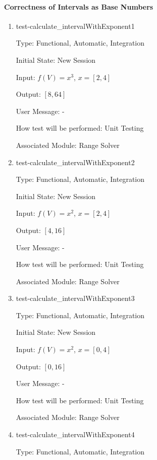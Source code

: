 \documentclass[12pt, titlepage]{article}
\begin{document}
\paragraph{Correctness of Intervals as Base Numbers}

\begin{enumerate}
	
	\item{test-calculate\_intervalWithExponent1}
	
	Type: Functional, Automatic, Integration
	
	Initial State: New Session
	
	Input: $f(V) = x^3$, $x = [2,4]$
	
	Output: $[8,64]$
	
	User Message: - 
	
	How test will be performed: Unit Testing
	
	Associated Module: Range Solver\\
	
	\item{test-calculate\_intervalWithExponent2}
	
	Type: Functional, Automatic, Integration
	
	Initial State: New Session
	
	Input: $f(V) = x^2$, $x = [2,4]$
	
	Output: $[4,16]$
	
	User Message: - 
	
	How test will be performed: Unit Testing
	
	Associated Module: Range Solver\\
	
	\item{test-calculate\_intervalWithExponent3}
	
	Type: Functional, Automatic, Integration
	
	Initial State: New Session
	
	Input: $f(V) = x^2$, $x = [0,4]$
	
	Output: $[0,16]$
	
	User Message: - 
	
	How test will be performed: Unit Testing
	
	Associated Module: Range Solver\\
	
	\item{test-calculate\_intervalWithExponent4}
	
	Type: Functional, Automatic, Integration
	

\end{enumerate}
\end{document}
